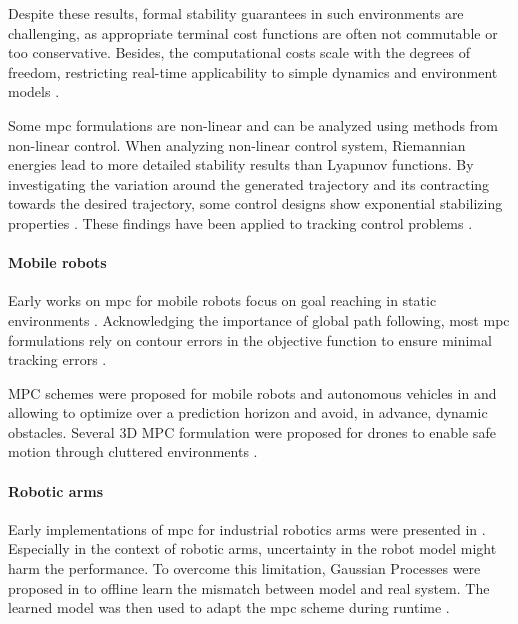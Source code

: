 Despite these results, formal stability
guarantees in such environments are challenging, as appropriate terminal cost
functions are often not commutable or too conservative. Besides, the
computational costs scale with the degrees of freedom, restricting real-time
applicability to simple dynamics and environment models \cite{Spahn2021}.

Some \ac{mpc} formulations are non-linear and can be analyzed
using methods from non-linear control. When analyzing non-linear control
system, Riemannian energies lead to more detailed stability results than
Lyapunov functions. By investigating the variation around the generated
trajectory and its contracting towards the desired trajectory, some control
designs show exponential stabilizing properties \cite{l2}. These
findings have been applied to tracking control problems \cite{l3}.

\paragraph{Mobile robots}

Early works on \ac{mpc} for mobile robots focus on goal
reaching in static environments \cite{howard2010receding}.
Acknowledging the importance of global path following, most
\ac{mpc} formulations rely on contour errors in the
objective function to ensure minimal tracking errors
\cite{lam2010model,brown2017safe}.

MPC schemes were proposed for mobile robots and autonomous vehicles in
\cite{Brito2019} and \cite{Schwarting2018} allowing to optimize over a
prediction horizon and avoid, in advance, dynamic obstacles.  Several 3D MPC
formulation were proposed for drones to enable safe motion through cluttered
environments \cite{Tordesillas2019,Liu2017}.

\paragraph{Robotic arms}

Early implementations of \ac{mpc} for industrial robotics
arms were presented in \cite{faulwasser2016implementation}.
Especially in the context of robotic arms, uncertainty in
the robot model might harm the performance. To overcome this
limitation, Gaussian Processes were proposed in
\cite{hewing2019cautious,carron2019data} to offline learn
the mismatch between model and real system. The learned
model was then used to adapt the \ac{mpc} scheme during
runtime \cite{carron2019data}.

